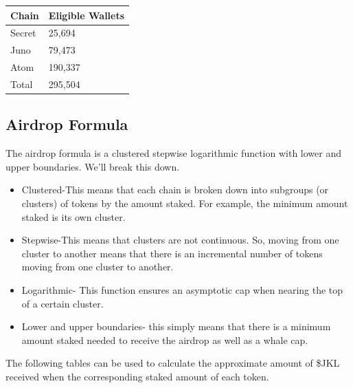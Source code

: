 \documentclass[11pt, nofootinbib]{article}
\begin{document}
\begin{center}
\begin{tabular}{| l | l |}
\hline
\rowcolor{Black!80}
\color{White}Chain & \color{White}Eligible Wallets \\
\hline
\hline
Secret & 25,694 \\
\hline
\rowcolor{Black!5}
Juno & 79,473 \\
\hline
Atom & 190,337 \\ 
\hline
\rowcolor{Goldenrod!60}
Total & 295,504 \\
\hline
\end{tabular}
\end{center}

\subsection{Airdrop Formula}

The airdrop formula is a clustered stepwise logarithmic function with lower and upper boundaries. We’ll
break this down.
\begin{itemize}
\item Clustered-This means that each chain is broken down into subgroups (or clusters) of tokens by the
amount staked. For example, the minimum amount staked is its own cluster.
\item Stepwise-This means that clusters are not continuous. So, moving from one cluster to another means
that there is an incremental number of tokens moving from one cluster to another.
\item Logarithmic- This function ensures an asymptotic cap when nearing the top of a certain cluster.
\item Lower and upper boundaries- this simply means that there is a minimum amount staked needed to
receive the airdrop as well as a whale cap.
\end{itemize}
The following tables can be used to calculate the approximate amount of \$JKL received when the
corresponding staked amount of each token.
\end{document}
